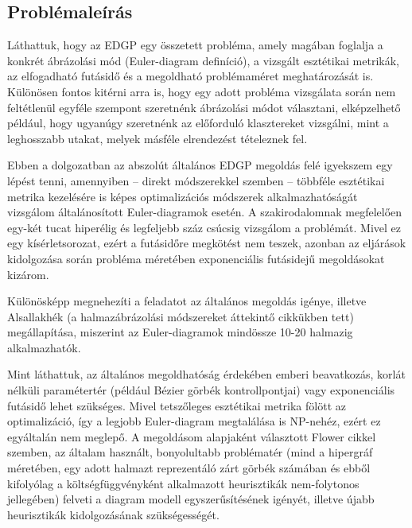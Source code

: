 \subsection{Problémaleírás}

Láthattuk, hogy az EDGP egy összetett probléma, amely magában foglalja a konkrét ábrázolási mód (Euler-diagram definíció), a vizsgált esztétikai metrikák, az elfogadható futásidő és a megoldható problémaméret meghatározását is. Különösen fontos kitérni arra is, hogy egy adott probléma vizsgálata során nem feltétlenül egyféle szempont szeretnénk ábrázolási módot választani, elképzelhető például, hogy ugyanúgy szeretnénk az előforduló klasztereket vizsgálni, mint a leghosszabb utakat, melyek másféle elrendezést tételeznek fel.

Ebben a dolgozatban az abszolút általános EDGP megoldás felé igyekszem egy lépést tenni, amennyiben -- direkt módszerekkel szemben  -- többféle esztétikai metrika kezelésére is képes optimalizációs módszerek alkalmazhatóságát vizsgálom általánosított Euler-diagramok esetén. A szakirodalomnak megfelelően egy-két tucat hiperélig és legfeljebb száz csúcsig vizsgálom a problémát. Mivel ez egy kísérletsorozat, ezért a futásidőre megkötést nem teszek, azonban az eljárások kidolgozása során probléma méretében exponenciális futásidejű megoldásokat kizárom.

Különösképp megnehezíti a feladatot az általános megoldás igénye, illetve Alsallakhék (a halmazábrázolási módszereket áttekintő cikkükben\cite{alsallakah2016_the_state_of_the_art_set_visualization} tett) megállapítása, miszerint az Euler-diagramok mindössze 10-20 halmazig alkalmazhatók.


Mint láthattuk, az általános megoldhatóság érdekében emberi beavatkozás, korlát nélküli paramétertér (például Bézier görbék kontrollpontjai\cite{layout_metrics}) vagy exponenciális futásidő\cite{inductive_euler} lehet szükséges. Mivel tetszőleges esztétikai metrika fölött az optimalizáció, így a legjobb Euler-diagram megtalálása is NP-nehéz, ezért ez egyáltalán nem meglepő. A megoldásom alapjaként választott Flower cikkel\cite{layout_metrics} szemben, az általam használt, bonyolultabb problématér (mind a hipergráf méretében, egy adott halmazt reprezentáló zárt görbék számában és ebből kifolyólag a költségfüggvényként alkalmazott heurisztikák nem-folytonos jellegében) felveti a diagram modell egyszerűsítésének igényét, illetve újabb heurisztikák kidolgozásának szükségességét.


